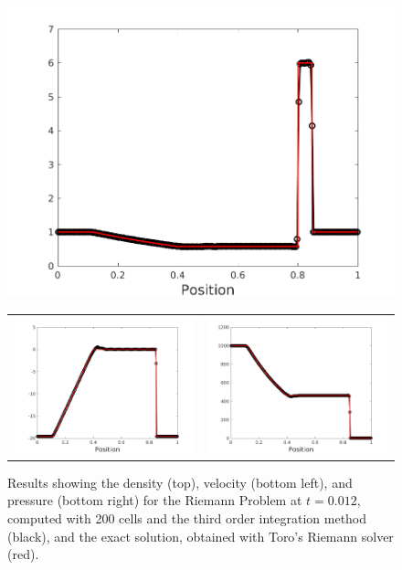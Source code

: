 \documentclass[10pt,preprint]{aastex}
\begin{document}
\begin{figure}[h]
  \begin{center}
     \includegraphics[width=.95\textwidth]{RiemannProblem_d5.png}
	\begin{tabular}{cc}
      \includegraphics[width=.475\textwidth]{RiemannProblem_v5.png} &
	  \includegraphics[width=.475\textwidth]{RiemannProblem_p5.png}
	\end{tabular}	
  \end{center}
  \caption{Results showing the density (top), velocity (bottom left), and pressure (bottom right) for the Riemann Problem at $t=0.012$, computed with 200 cells and the third order integration method (black), and the exact solution, obtained with Toro's Riemann solver (red).}
  \label{fig:Riemann}
\end{figure}
\end{document}

